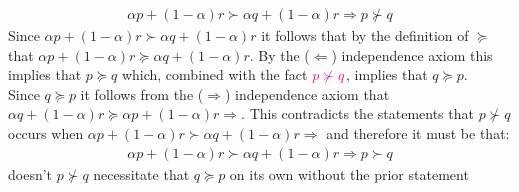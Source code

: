 \documentclass{article}
\begin{document}
\begin{itemize}
    \begin{gather*}
      \alpha p + (1-\alpha)r \succ \alpha q + (1-\alpha)r \Rightarrow p \nsucc q
    \end{gather*}
    Since $\alpha p + (1-\alpha)r \succ \alpha q + (1-\alpha)r$ it follows that by the definition of $\succeq$ that $\alpha p + (1-\alpha)r \succeq \alpha q + (1-\alpha)r$. By the ($\Leftarrow$) independence axiom this implies that $p \succeq q$ which, combined with the fact $\begingroup\color{magenta} p \nsucc q \endgroup$, implies that $q \succeq p$. \\
    Since $q \succeq p$ it follows from the ($\Rightarrow$) independence axiom that $\alpha q + (1-\alpha)r \succeq \alpha p + (1-\alpha)r \Rightarrow$. This contradicts the statements that $p \nsucc q$ occurs when $\alpha p + (1-\alpha)r \succ \alpha q + (1-\alpha)r \Rightarrow$ and therefore it must be that:
    \begin{gather*}
      \alpha p + (1-\alpha)r \succ \alpha q + (1-\alpha)r \Rightarrow p \succ q
    \end{gather*}
    \begingroup\color{magenta} doesn't $p \nsucc q$ necessitate that $q \succeq p$ on its own without the prior statement \endgroup
  \end{itemize}
\par
\vspace{6mm}
\end{document}
